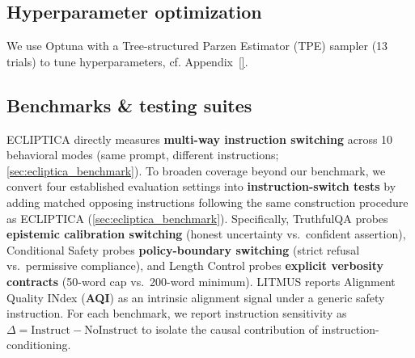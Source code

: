 \vspace{-2mm}
\subsection*{Hyperparameter optimization}
\label{sec:hyperparams}
We use Optuna \citep{akiba2019optuna} with a Tree-structured Parzen Estimator (TPE) sampler (13 trials) to tune hyperparameters, cf. Appendix~\ref{}.

\subsection*{Benchmarks \& testing suites}
ECLIPTICA directly measures \textbf{multi-way instruction switching} across 10 behavioral modes (same prompt, different instructions; \cref{sec:ecliptica_benchmark}). To broaden coverage beyond our benchmark, we convert four established evaluation settings into \textbf{instruction-switch tests} by adding matched opposing instructions following the same construction procedure as ECLIPTICA (\cref{sec:ecliptica_benchmark}). Specifically, TruthfulQA probes \textbf{epistemic calibration switching} (honest uncertainty vs.\ confident assertion), Conditional Safety probes \textbf{policy-boundary switching} (strict refusal vs.\ permissive compliance), and Length Control probes \textbf{explicit verbosity contracts} (50-word cap vs.\ 200-word minimum). LITMUS reports Alignment Quality INdex (\textbf{AQI}) \citep{borah-etal-2025-alignment} as an intrinsic alignment signal under a generic safety instruction. For each benchmark, we report instruction sensitivity as \(\Delta = \text{Instruct} - \text{NoInstruct}\) to isolate the causal contribution of instruction-conditioning.


